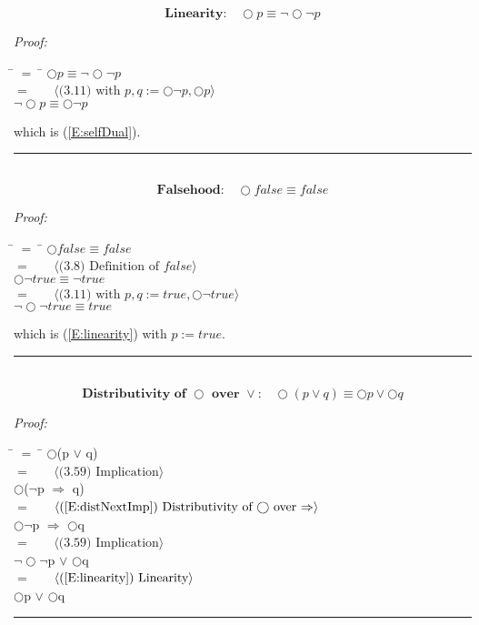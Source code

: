\documentclass[fleqn, leqno]{article}
\newcommand{\lgap}{2pt}                             %
\newcommand{\mymathindent}{24pt}                      %
\newcommand{\myqed}{\hfill\rule[-.23ex]{1.2ex}{2.0ex}}
\newcommand{\Gll} {\langle}                         %
\newcommand{\Ggg} {\rangle}                         %
\newcommand{\Hint}[1]     {\ \ \ $\Gll              \mbox{#1} \Ggg$ }   %
\begin{document}
\begin{equation}\label{E:linearity}
\textbf{Linearity:}\quad \bigcirc p \equiv \lnot\bigcirc\lnot p
\end{equation}

\emph{Proof:}
\begin{tabbing}
\hspace{\mymathindent} \= $= \;$ \= \kill
  \> \>   $\bigcirc p \equiv \lnot\bigcirc\lnot p$\\[\lgap]
  \> $=$  \>  \Hint{(3.11) with $p,q := \bigcirc\lnot p, \bigcirc p$} \\[\lgap]
  \> \>   $\lnot\bigcirc p \equiv \bigcirc\lnot p$
\end{tabbing}
which is (\ref{E:selfDual}). \myqed\\[\lgap]


\begin{equation}\label{E:nextFalse}
\textbf{Falsehood:}\quad \bigcirc false \equiv false
\end{equation}

\emph{Proof:}
\begin{tabbing}
\hspace{\mymathindent} \= $= \;$ \= \kill
  \> \>   $\bigcirc false \equiv false$\\[\lgap]
  \> $=$  \>  \Hint{(3.8) Definition of $false$} \\[\lgap]
  \> \>   $\bigcirc\lnot true \equiv \lnot true$\\[\lgap]
  \> $=$  \>  \Hint{(3.11) with $p,q := true, \bigcirc\lnot true$}\\[\lgap]
  \> \>   $\lnot\bigcirc\lnot true \equiv true$\\[\lgap]
\end{tabbing}
which is (\ref{E:linearity}) with $p := true$. \myqed\\[\lgap]


\begin{equation}\label{E:distNextOr}
\textbf{Distributivity of $\bigcirc$ over $\lor$:}\quad \bigcirc (p \lor q) \equiv \bigcirc p \lor \bigcirc q
\end{equation}


\emph{Proof:}
\begin{tabbing}
\hspace{\mymathindent} \= $= \;$ \= \kill
	\> \>   $\bigcirc$(p $\lor$ q)\\[\lgap]
	\> $=$  \>  \Hint{(3.59) Implication}\\[\lgap]
	\> \>   $\bigcirc$($\lnot$p $\Rightarrow$ q)\\[\lgap]
	\> $=$  \>  \Hint{(\ref{E:distNextImp}) Distributivity of $\bigcirc$ over $\Rightarrow$}\\[\lgap]
	\> \>   $\bigcirc\lnot$p $\Rightarrow$ $\bigcirc$q\\[\lgap]
	\> $=$  \>  \Hint{(3.59) Implication}\\[\lgap]
	\> \>   $\lnot\bigcirc\lnot$p $\lor$ $\bigcirc$q\\[\lgap]
	\> $=$  \>  \Hint{(\ref{E:linearity}) Linearity}\\[\lgap]
	\> \>   $\bigcirc$p $\lor$ $\bigcirc$q
\end{tabbing}
\myqed\\[\lgap]
\end{document}
